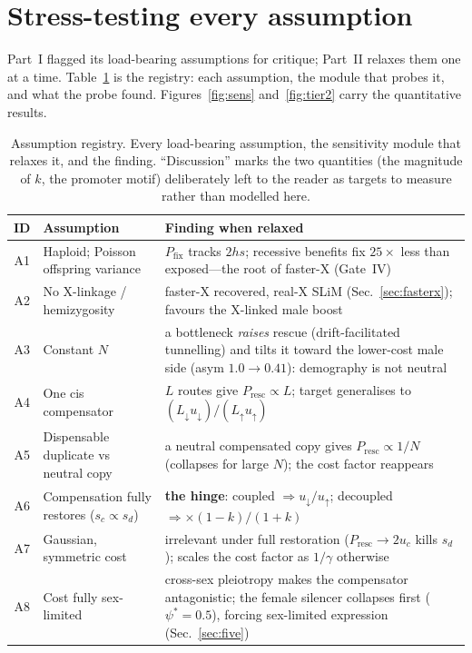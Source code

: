\documentclass[11pt,a4paper]{article}
\newcommand{\Pfix}{P_{\mathrm{fix}}}
\newcommand{\Presc}{P_{\mathrm{resc}}}
\begin{document}
\section{Stress-testing every assumption}

Part~I flagged its load-bearing assumptions for critique; Part~II relaxes them one at a time. Table~\ref{tab:registry} is the registry: each assumption, the module that probes it, and what the probe found. Figures~\ref{fig:sens} and~\ref{fig:tier2} carry the quantitative results.

\begin{table}[h!]
\centering\footnotesize
\caption{Assumption registry. Every load-bearing assumption, the sensitivity module that relaxes it, and the finding. ``Discussion'' marks the two quantities (the magnitude of $k$, the promoter motif) deliberately left to the reader as targets to measure rather than modelled here.}
\label{tab:registry}
\begin{tabular}{c p{4.5cm} p{6.6cm}}
\toprule
\textbf{ID} & \textbf{Assumption} & \textbf{Finding when relaxed} \\
\midrule
A1 & Haploid; Poisson offspring variance & $\Pfix$ tracks $2hs$; recessive benefits fix $25\times$ less than exposed---the root of faster-X (Gate~IV) \\
A2 & No X-linkage / hemizygosity & faster-X recovered, real-X SLiM (Sec.~\ref{sec:fasterx}); favours the X-linked male boost \\
A3 & Constant $N$ & a bottleneck \emph{raises} rescue (drift-facilitated tunnelling) and tilts it toward the lower-cost male side (asym $1.0\!\to\!0.41$): demography is not neutral \\
A4 & One cis compensator & $L$ routes give $\Presc\propto L$; target generalises to $(L_{\downarrow}u_{\downarrow})/(L_{\uparrow}u_{\uparrow})$ \\
A5 & Dispensable duplicate vs neutral copy & a neutral compensated copy gives $\Presc\propto 1/N$ (collapses for large $N$); the cost factor reappears \\
A6 & Compensation fully restores ($s_c\!\propto\! s_d$) & \textbf{the hinge}: coupled $\Rightarrow u_{\downarrow}/u_{\uparrow}$; decoupled $\Rightarrow \times(1{-}k)/(1{+}k)$ \\
A7 & Gaussian, symmetric cost & irrelevant under full restoration ($\Presc\!\to\!2u_c$ kills $s_d$); scales the cost factor as $1/\gamma$ otherwise \\
A8 & Cost fully sex-limited & cross-sex pleiotropy makes the compensator antagonistic; the female silencer collapses first ($\psi^\ast{=}0.5$), forcing sex-limited expression (Sec.~\ref{sec:five}) \\

\end{tabular}
\end{table}
\end{document}
